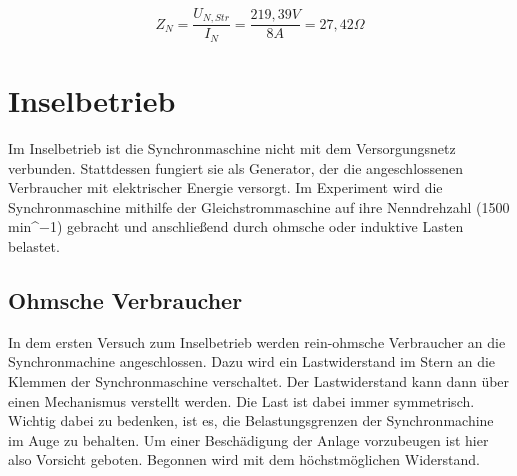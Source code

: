 \documentclass{report}
\begin{document}
\begin{equation}
	\label{eq:3}
	Z_{N} = \frac{U_{N,Str}}{I_{N}} = \frac{219,39V}{8A} = 27,42\Omega
\end{equation}


\section{Inselbetrieb}
\label{sec:inselbetrieb}


Im Inselbetrieb ist die Synchronmaschine nicht mit dem Versorgungsnetz verbunden. Stattdessen fungiert sie als Generator, der die angeschlossenen Verbraucher mit elektrischer Energie versorgt. Im Experiment wird die Synchronmaschine mithilfe der Gleichstrommaschine auf ihre Nenndrehzahl (1500 min^−1) gebracht und anschließend durch ohmsche oder induktive Lasten belastet.

\subsection{Ohmsche Verbraucher}
\label{sec:ohmsche-verbraucher}

In dem ersten Versuch zum Inselbetrieb werden rein-ohmsche Verbraucher an die Synchronmachine angeschlossen. Dazu wird ein Lastwiderstand im Stern an die Klemmen der Synchronmaschine verschaltet. Der Lastwiderstand kann dann über einen Mechanismus verstellt werden. Die Last ist dabei immer symmetrisch. Wichtig dabei zu bedenken, ist es, die Belastungsgrenzen der Synchronmachine im Auge zu behalten. Um einer Beschädigung der Anlage vorzubeugen ist hier also Vorsicht geboten. Begonnen wird mit dem höchstmöglichen Widerstand.
\end{document}
